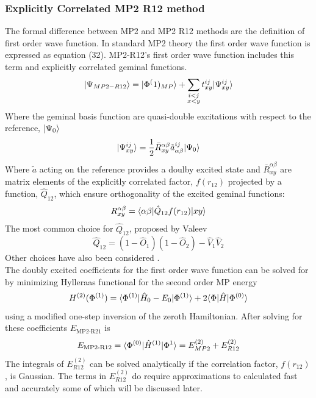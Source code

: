     \subsubsection{Explicitly Correlated MP2 R12 method}
      The formal difference between MP2 and MP2 R12 methods are the definition of first order wave function.  In standard MP2 theory the first order wave function is expressed as equation (32).  MP2-R12's first order wave function includes this term and explicitly correlated geminal functions.
        \begin{equation}
          | \Psi_{MP2-R12} \rangle = | \Phi^(1)_{MP} \rangle + \sum_{\substack{i<j \\ x<y}} t^{ij}_{xy} | \Psi^{ij}_{xy} \rangle
        \end{equation}
      Where the geminal basis function are quasi-double excitations with respect to the reference, $| \Psi_0 \rangle$
        \begin{equation}
        | \Psi^{ij}_{xy} \rangle = \frac{1}{2} \bar{R}^{\alpha \beta}_{xy} \tilde{a}^{ij}_{\alpha \beta} | \Psi_0 \rangle
        \end{equation}
      Where $\tilde{a}$ acting on the reference provides a doulby excited state and $\bar{R}^{\alpha\beta}_{xy}$ are matrix elements of the explicitly correlated factor, $f(r_{12})$ projected by a function, $\hat{Q}_{12}$, which ensure orthogonality of the excited geminal functions:
        \begin{equation}
          R^{\alpha \beta}_{xy} = \langle\alpha \beta | \hat{Q}_{12} f(r_{12})| xy \rangle
        \end{equation}
      The most common choice for $\hat{Q}_{12}$, proposed by Valeev\cite{Valeev 2004} 
        \begin{equation}
          \hat{Q}_{12} = (1-\hat{O}_1)(1-\hat{O}_2)- \hat{V}_1 \hat{V}_2
        \end{equation}
      Other choices have also been considered \cite{wind 2002, Koppler 2002}.\\
      The doubly excited coefficients for the first order wave function can be solved for by minimizing Hylleraas functional for the second order MP energy 
        \begin{equation}
          H^{(2)} (\Phi^{(1)}) = \langle\Phi^{(1)} | \hat{H}_0 - E_0 | \Phi^{(1)} \rangle + 2 \langle\Phi |\hat{H}| \Phi^{(0)} \rangle
        \end{equation}
      using a modified one-step inversion of the zeroth Hamiltonian.  After solving for these coefficients $E_{\text{MP2-R21}}$ is 
        \begin{equation}
          E_{\text{MP2-R12}} = \langle\Phi^{(0)} | \hat{H}^{(1)} | \Phi^{1} \rangle = E^{(2)}_{MP2} + E^{(2)}_{R12}
        \end{equation}
      The integrals of $E^{(2)}_{R12}$ can be solved analytically if the correlation factor, $f(r_{12})$, is Gaussian\cite{Polly 2006}.  The terms in $E^{(2)}_{R12}$ do require approximations to calculated fast and accurately some of which will be discussed later\cite{Kong 2012}.

